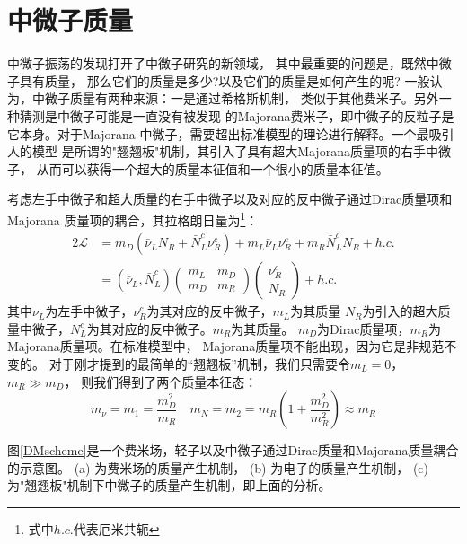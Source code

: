 \section{中微子质量}\label{sec:neutrino_mass}
中微子振荡的发现打开了中微子研究的新领域，
其中最重要的问题是，既然中微子具有质量，
那么它们的质量是多少?以及它们的质量是如何产生的呢?
一般认为，中微子质量有两种来源：一是通过希格斯机制，
类似于其他费米子。另外一种猜测是中微子可能是一直没有被发现
的Majorana费米子，即中微子的反粒子是它本身。对于Majorana
中微子，需要超出标准模型的理论进行解释。一个最吸引人的模型
是所谓的"翘翘板"机制，其引入了具有超大Majorana质量项的右手中微子，
从而可以获得一个超大的质量本征值和一个很小的质量本征值。


考虑左手中微子和超大质量的右手中微子以及对应的反中微子通过Dirac质量项和Majorana
质量项的耦合，其拉格朗日量为\cite{zuber2020neutrino}\footnote{式中$h.c.$代表厄米共轭}：
\begin{align}
    \label{Lagrangian_D-M}
    2\mathcal{L} &= m_D (\bar{\nu}_L N_R + \bar{N}_L^c \nu_R^c) + m_L \bar{\nu}_L \nu_R^c + m_R \bar{N}_L^c N_R + h.c. \\
    &= (\bar{\nu}_L, \bar{N}_L^c) 
    \begin{pmatrix}
    m_L & m_D \\
    m_D & m_R
    \end{pmatrix}
    \begin{pmatrix}
    \nu_R^c \\
    N_R
    \end{pmatrix}
    + h.c.
\end{align}
其中$\nu_L$为左手中微子，$\nu^c_R$为其对应的反中微子，$m_L$为其质量
$N_R$为引入的超大质量中微子，$N^c_L$为其对应的反中微子。$m_R$为其质量。
$m_D$为Dirac质量项，$m_R$为Majorana质量项。在标准模型中，
Majorana质量项不能出现，因为它是非规范不变的。
对于刚才提到的最简单的“翘翘板”机制，我们只需要令$m_L=0$，$m_R\gg m_D$，
则我们得到了两个质量本征态：
\begin{equation}
    m_\nu = m_1 = \frac{m^2_D}{m_R} \quad m_N = m_2
    = m_R\left(1+\frac{m^2_D}{m^2_R}\right) \approx m_R
\end{equation}


    
图\ref{DMscheme}是一个费米场，轻子以及中微子通过Dirac质量和Majorana质量耦合的示意图。
 (a) 为费米场的质量产生机制， (b) 为电子的质量产生机制， (c) 为"翘翘板"机制下中微子的质量产生机制，即上面的分析。

